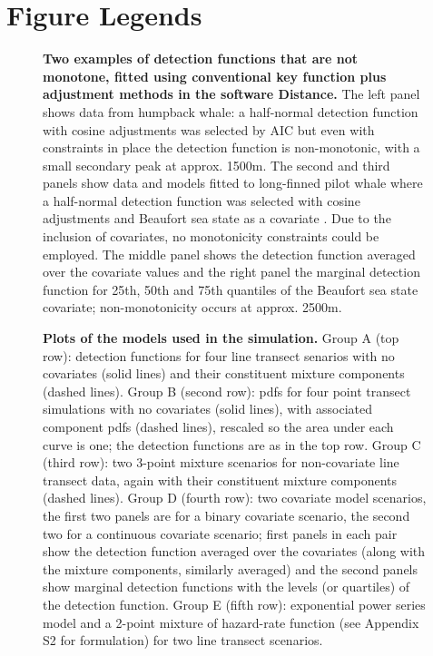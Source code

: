 \documentclass[10pt]{article}
\begin{document}
\section*{Figure Legends}

\begin{figure}[!ht]
\centering
\caption{
{\bf Two examples of detection functions that are not monotone, fitted using conventional key function plus adjustment methods in the software Distance.} The left panel shows data from humpback whale: a half-normal detection function with cosine adjustments was selected by AIC \cite{Williams:2007tc} but even with constraints in place the detection function is non-monotonic, with a small secondary peak at approx. 1500m. The second and third panels show data and models fitted to long-finned pilot whale where a half-normal detection function was selected with cosine adjustments and Beaufort sea state as a covariate \cite{Pike:2003ug}. Due to the inclusion of covariates, no monotonicity constraints could be employed.  The middle panel shows the detection function averaged over the covariate values and the right panel the marginal detection function for 25th, 50th and 75th quantiles of the Beaufort sea state covariate; non-monotonicity occurs at approx. 2500m.
}
\label{fig1}
\end{figure}


\begin{figure}[!ht]
\centering
\caption{
{\bf Plots of the models used in the simulation.} Group A (top row): detection functions for four line transect senarios with no covariates (solid lines) and their constituent mixture components (dashed lines). Group B (second row): pdfs for four point transect simulations with no covariates (solid lines), with associated component pdfs (dashed lines), rescaled so the area under each curve is one; the detection functions are as in the top row. Group C (third row): two 3-point mixture scenarios for non-covariate line transect data, again with their constituent mixture components (dashed lines). Group D (fourth row): two covariate model scenarios, the first two panels are for a binary covariate scenario, the second two for a continuous covariate scenario; first panels in each pair show the detection function averaged over the covariates (along with the mixture components, similarly averaged) and the second panels show marginal detection functions with the levels (or quartiles) of the detection function.  Group E (fifth row): exponential power series model and a 2-point mixture of hazard-rate function (see Appendix S2 for formulation) for two line transect scenarios.
}
\label{sim-detfcts}
\end{figure}
\end{document}
